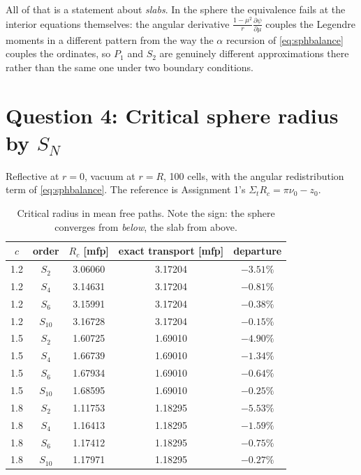 \documentclass[11pt]{article}
\begin{document}
All of that is a statement about \emph{slabs}. In the sphere the equivalence fails at the interior equations themselves: the angular derivative $\frac{1-\mu^2}{r}\frac{\partial\psi}{\partial\mu}$ couples the Legendre moments in a different pattern from the way the $\alpha$ recursion of \eqref{eq:sphbalance} couples the ordinates, so $P_1$ and $S_2$ are genuinely different approximations there rather than the same one under two boundary conditions.

\newpage
\section*{Question 4: Critical sphere radius by $S_N$}

Reflective at $r=0$, vacuum at $r=R$, 100 cells, with the angular redistribution term of \eqref{eq:sphbalance}. The reference is Assignment 1's $\Sigma_t R_c = \pi \nu_0 - z_0$.

\begin{table}[htbp]
\centering
\begin{tabular}{ccccc}
\toprule
$c$ & order & $R_c$ [mfp] & exact transport [mfp] & departure \\
\midrule
1.2 & $S_2$    & 3.06060 & 3.17204 & $-3.51\%$ \\
1.2 & $S_4$    & 3.14631 & 3.17204 & $-0.81\%$ \\
1.2 & $S_6$    & 3.15991 & 3.17204 & $-0.38\%$ \\
1.2 & $S_{10}$ & 3.16728 & 3.17204 & $-0.15\%$ \\
\midrule
1.5 & $S_2$    & 1.60725 & 1.69010 & $-4.90\%$ \\
1.5 & $S_4$    & 1.66739 & 1.69010 & $-1.34\%$ \\
1.5 & $S_6$    & 1.67934 & 1.69010 & $-0.64\%$ \\
1.5 & $S_{10}$ & 1.68595 & 1.69010 & $-0.25\%$ \\
\midrule
1.8 & $S_2$    & 1.11753 & 1.18295 & $-5.53\%$ \\
1.8 & $S_4$    & 1.16413 & 1.18295 & $-1.59\%$ \\
1.8 & $S_6$    & 1.17412 & 1.18295 & $-0.75\%$ \\
1.8 & $S_{10}$ & 1.17971 & 1.18295 & $-0.27\%$ \\
\bottomrule
\end{tabular}
\caption{Critical radius in mean free paths. Note the sign: the sphere converges from \emph{below}, the slab from above.}
\end{table}
\end{document}
